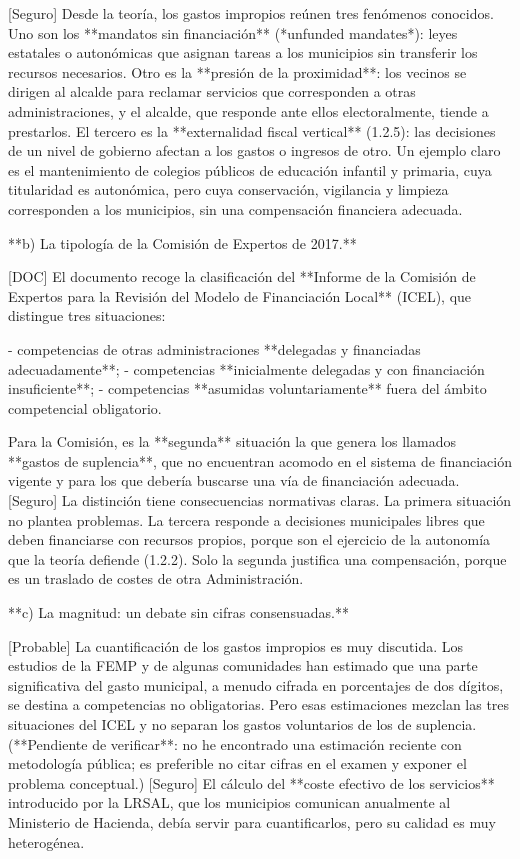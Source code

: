 \documentclass[10pt,a4paper]{article}
\begin{document}
[Seguro] Desde la teoría, los gastos impropios reúnen tres fenómenos conocidos. Uno son los **mandatos sin financiación** (*unfunded mandates*): leyes estatales o autonómicas que asignan tareas a los municipios sin transferir los recursos necesarios. Otro es la **presión de la proximidad**: los vecinos se dirigen al alcalde para reclamar servicios que corresponden a otras administraciones, y el alcalde, que responde ante ellos electoralmente, tiende a prestarlos. El tercero es la **externalidad fiscal vertical** (1.2.5): las decisiones de un nivel de gobierno afectan a los gastos o ingresos de otro. Un ejemplo claro es el mantenimiento de colegios públicos de educación infantil y primaria, cuya titularidad es autonómica, pero cuya conservación, vigilancia y limpieza corresponden a los municipios, sin una compensación financiera adecuada.

**b) La tipología de la Comisión de Expertos de 2017.**

[DOC] El documento recoge la clasificación del **Informe de la Comisión de Expertos para la Revisión del Modelo de Financiación Local** (ICEL), que distingue tres situaciones:

- competencias de otras administraciones **delegadas y financiadas adecuadamente**;
- competencias **inicialmente delegadas y con financiación insuficiente**;
- competencias **asumidas voluntariamente** fuera del ámbito competencial obligatorio.

Para la Comisión, es la **segunda** situación la que genera los llamados **gastos de suplencia**, que no encuentran acomodo en el sistema de financiación vigente y para los que debería buscarse una vía de financiación adecuada. [Seguro] La distinción tiene consecuencias normativas claras. La primera situación no plantea problemas. La tercera responde a decisiones municipales libres que deben financiarse con recursos propios, porque son el ejercicio de la autonomía que la teoría defiende (1.2.2). Solo la segunda justifica una compensación, porque es un traslado de costes de otra Administración.

**c) La magnitud: un debate sin cifras consensuadas.**

[Probable] La cuantificación de los gastos impropios es muy discutida. Los estudios de la FEMP y de algunas comunidades han estimado que una parte significativa del gasto municipal, a menudo cifrada en porcentajes de dos dígitos, se destina a competencias no obligatorias. Pero esas estimaciones mezclan las tres situaciones del ICEL y no separan los gastos voluntarios de los de suplencia. (**Pendiente de verificar**: no he encontrado una estimación reciente con metodología pública; es preferible no citar cifras en el examen y exponer el problema conceptual.) [Seguro] El cálculo del **coste efectivo de los servicios** introducido por la LRSAL, que los municipios comunican anualmente al Ministerio de Hacienda, debía servir para cuantificarlos, pero su calidad es muy heterogénea.
\end{document}
